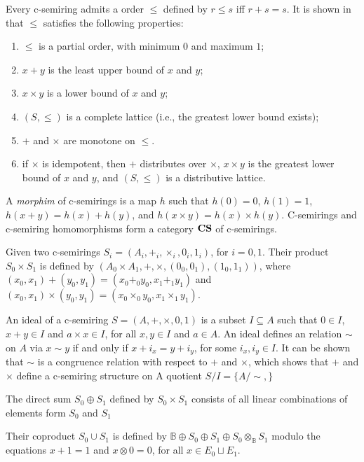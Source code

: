 \documentclass[runningheads]{llncs}
\newcommand{\cbot}{0}
\newcommand{\ctop}{1}
\newcommand{\ctimes}{\times}
\newcommand{\cplus}{+}
\newcommand{\CS}{{\bf CS}}
\begin{document}
Every c-semiring admits a order $\leq$ defined by $r \leq s$ iff $r \cplus s = s$.
It is shown in \cite{BMR97} that $\leq$ satisfies the following properties:

\begin{enumerate}
    \item $\leq$ is a partial order, with minimum $\cbot$ and maximum $\ctop$; 
    \item $x \cplus y$ is the least upper bound of $x$ and $y$;
    \item $x \ctimes y$ is a lower bound of $x$ and $y$;
    \item $(S,\leq)$ is a complete lattice (i.e., the greatest lower bound exists);
    \item $\cplus$ and $\ctimes$ are monotone on $\leq$.
    \item if $\ctimes$ is idempotent, then $\cplus$ distributes over $\ctimes$, $x \ctimes y$ is the greatest lower bound of $x$ and $y$, and $(S,\leq)$ is a distributive lattice.
\end{enumerate}

A {\em morphim} of c-semirings is a map $h$ such that $h(0) = 0$, $h(1) = 1$, $h(x \cplus y) = h(x) \cplus h(y)$, and $h(x \ctimes y) = h(x) \ctimes h(y)$.
C-semirings and c-semiring homomorphisms form a category $\CS$ of c-semirings.

Given two c-semirings $S_i = (A_i, \cplus_i, \ctimes_i, \cbot_i, \ctop_i)$, for $i=0,1$.
Their product $S_0 \times S_1$ is defined by $(A_0 \times A_1, \cplus, \ctimes, (0_0, 0_1), (1_0,1_1))$, where $(x_0,x_1) \cplus (y_0,y_1) = (x_0 \cplus_0 y_0, x_1 \cplus_1 y_1)$ and $(x_0,x_1) \ctimes (y_0,y_1) = (x_0 \ctimes_0 y_0, x_1 \ctimes_1 y_1)$.

An ideal of a c-semiring $S = (A, \cplus, \ctimes, \cbot, \ctop)$ is a subset $I \subseteq A$ such that $0 \in I$, $x \cplus y \in I$ and $a \ctimes x \in I$, for all $x,y \in I$ and $a \in A$.
An ideal defines an relation $\sim$ on $A$ via $x \sim y$ if and only if $x+i_x = y + i_y$, for some $i_x,i_y \in I$. 
It can be shown that $\sim$ is a congruence relation with respect to $\cplus$ and $\ctimes$, which shows that $\cplus$ and $\ctimes$ define a c-semiring structure on 
A quotient $S/I = \{ A / {\sim},  \}$

The direct sum $S_0 \oplus S_1$ defined by $S_0 \times S_1$ consists of all linear combinations of elements form $S_0$ and $S_1$

Their coproduct $S_0 \cup S_1$ is defined by $\mathbb{B} \oplus S_0 \oplus S_1 \oplus S_0 \otimes_\mathbb{B} S_1$ modulo the equations $x + 1 = 1$ and $x \otimes 0 = 0$, for all $x \in E_0 \sqcup E_1$. 
\end{document}

